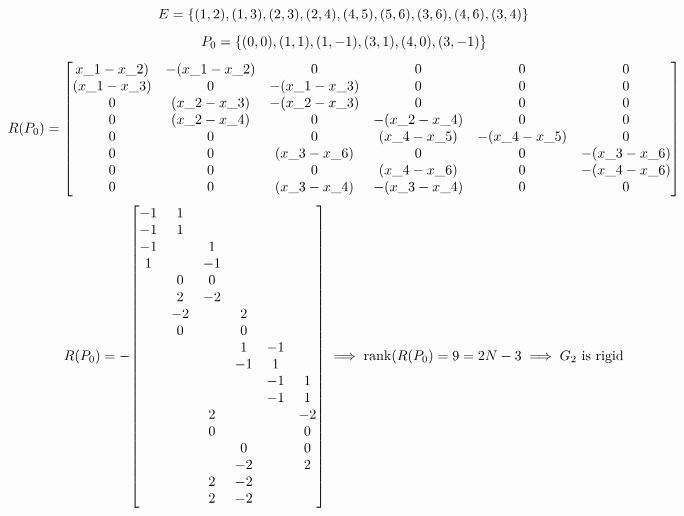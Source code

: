 \documentclass[]{article}
\numberwithin{equation}{section}
\begin{document}
\[
    E = \qty{
        (1,2),
        (1,3),
        (2,3),
        (2,4),
        (4,5),
        (5,6),
        (3,6),
        (4,6),
        (3,4)
    }
\]\[
    P_0 = \qty{
        ( 0, 0),
        ( 1, 1),
        ( 1,-1),
        ( 3, 1),
        ( 4, 0),
        ( 3,-1)
    }
\]\[
    R(P_0) = \mqty[
        x\_1 - x\_2) & -(x\_1 - x\_2) & 0              & 0              & 0              & 0              \\
        (x\_1 - x\_3) & 0              & -(x\_1 - x\_3) & 0              & 0              & 0              \\
        0             & (x\_2 - x\_3)  & -(x\_2 - x\_3) & 0              & 0              & 0              \\
        0             & (x\_2 - x\_4)  & 0              & -(x\_2 - x\_4) & 0              & 0              \\
        0             & 0              & 0              & (x\_4 - x\_5)  & -(x\_4 - x\_5) & 0              \\
        0             & 0              & (x\_3 - x\_6)  & 0              & 0              & -(x\_3 - x\_6) \\
        0             & 0              & 0              & (x\_4 - x\_6)  & 0              & -(x\_4 - x\_6) \\
        0             & 0              & (x\_3 - x\_4)  & -(x\_3 - x\_4) & 0              & 0   
    ]
\]\[
    R(P_0) = -\mqty[
        -1 & 1  &    &    &    &    \\
        -1 & 1  &    &    &    &    \\
        -1 &    & 1  &    &    &    \\
        1  &    & -1 &    &    &    \\
           & 0  & 0  &    &    &    \\
           & 2  & -2 &    &    &    \\
           & -2 &    & 2  &    &    \\
           & 0  &    & 0  &    &    \\
           &    &    & 1  & -1 &    \\
           &    &    & -1 & 1  &    \\
           &    &    &    & -1 & 1  \\
           &    &    &    & -1 & 1  \\
           &    & 2  &    &    & -2 \\
           &    & 0  &    &    & 0  \\
           &    &    & 0  &    & 0  \\
           &    &    & -2 &    & 2  \\
           &    & 2  & -2 &    &    \\
           &    & 2  & -2 &    &   
    ] \implies \rank(R(P_0) = 9 = 2 N -3
    \implies G_2 \text{ is rigid}
\]
\end{document}
